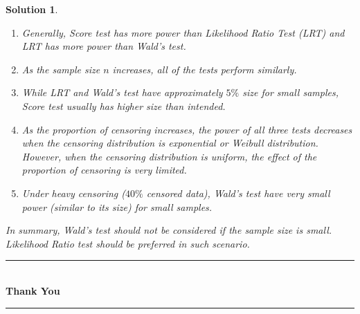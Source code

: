 \documentclass[12pt]{article}
\theoremstyle{problemstyle}
\newtheorem*{solution*}{Solution}
\begin{document}
\begin{solution*}
    \begin{enumerate}
        \item Generally, Score test has more power than Likelihood Ratio Test (LRT) and LRT has more power than Wald's test.
        \item As the sample size $n$ increases, all of the tests perform similarly.
        \item While LRT and Wald's test have approximately $5\%$ size for small samples,  Score test usually has higher size than intended.
        \item As the proportion of censoring increases, the power of all three tests decreases when the censoring distribution is exponential or Weibull distribution. However, when the censoring distribution is uniform, the effect of the proportion of censoring is very limited.
        \item Under heavy censoring ($40\%$ censored data), Wald's test have very small power (similar to its size) for small samples. 
    \end{enumerate}

    In summary, Wald's test should not be considered if the sample size is small. Likelihood Ratio test should be preferred in such scenario.

\end{solution*}









\pagebreak
\begin{center}
    \vspace*{5cm}
    \rule{0.8\linewidth}{0.1pt}\\
    \vspace*{2cm}
    \Huge \textbf{Thank You}\\
    \vspace*{2cm}
    \rule{0.8\linewidth}{0.1pt}
    \vfill
\end{center}
\end{document}
